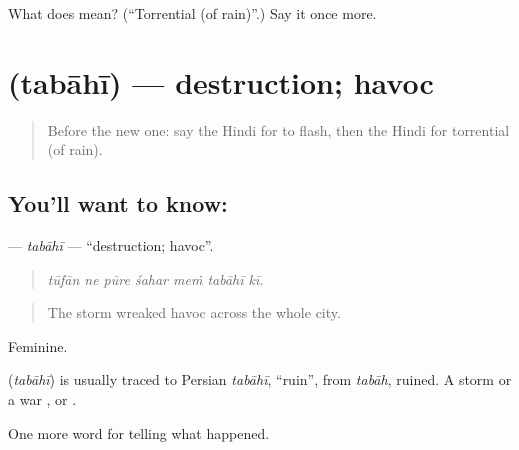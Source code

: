 \begin{tcolorbox}[breakable,colback=teal!4,colframe=teal!35!black,title={Before you move on}]
What does  mean? (\textquotedblleft{}Torrential (of rain)\textquotedblright{}.) Say it once more.
\end{tcolorbox}
\section[\texorpdfstring{\hi{तबाही} (tabāhī)}{तबाही (tabāhī)}]{ (tabāhī) — destruction; havoc}

\label{lesson:HI-C304-tabahi}



\begin{quote}
Before the new one: say the Hindi for to flash, then the Hindi for torrential (of rain).
\end{quote}

\subsection*{You'll want to know: }
\textbf{} — \emph{tabāhī} — \textquotedblleft{}destruction; havoc\textquotedblright{}.

\begin{quote}
      
\end{quote}

\begin{quote}
\emph{tūfān ne pūre śahar meṁ tabāhī kī.}
\end{quote}

\begin{quote}
The storm wreaked havoc across the whole city.
\end{quote}

Feminine.

\begin{cousinweb}
\textbf{} (\emph{tabāhī}) is usually traced to Persian \emph{tabāhī}, \textquotedblleft{}ruin\textquotedblright{}, from \emph{tabāh}, ruined. A storm or a war \textbf{  }, or \textbf{  }.
\end{cousinweb}

\begin{grammarlens}[title={What you've built}]
One more word for telling what happened.
\end{grammarlens}


